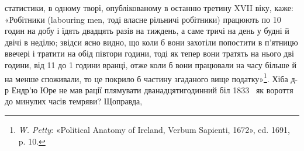 статистики, в одному творі, опублікованому в останню
третину XVII віку, каже: «Робітники (labouring men, тоді власне
рільничі робітники) працюють по 10 годин на добу і їдять двадцять
разів на тиждень, а саме тричі на день у будні й двічі в неділю;
звідси ясно видно, що коли б вони захотіли попостити в
п’ятницю ввечері і тратити на обід півтори години, тоді як тепер
вони тратять на нього дві години, від 11 до 1 години вранці, отже
коли б вони працювали на  часу більше й на  менше споживали,
то це покрило б  частину згаданого вище податку»\footnote{
\emph{W. Petty}: «Political Anatomy of Ireland, Verbum Sapienti, 1672»,
ed. 1691, p. 10.
}.
Хіба д-р Ендр’ю Юре не мав рації плямувати дванадцятигодинний
біл 1833~ як вороття до минулих часів темряви? Щоправда,
\parbreak{}  %
